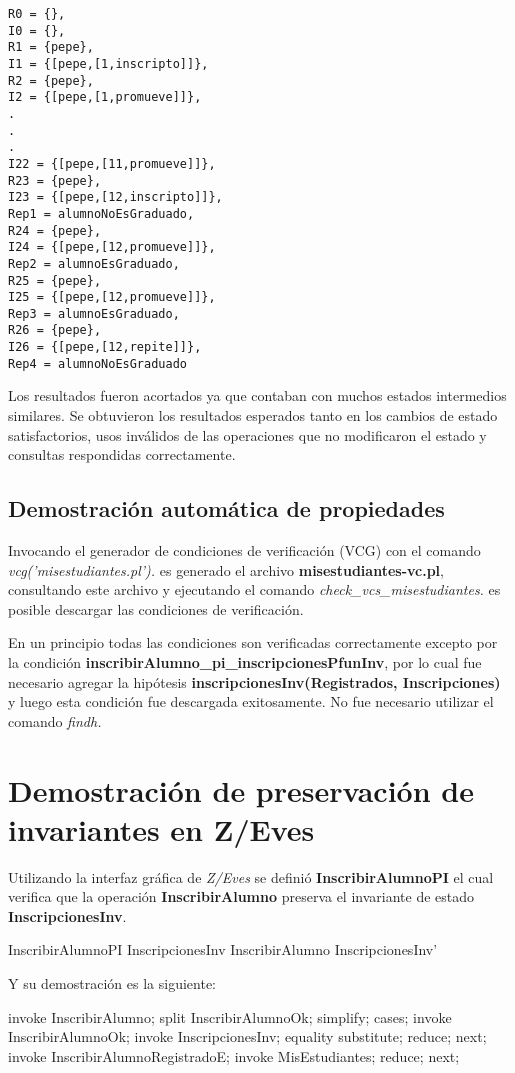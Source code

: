 \documentclass{article}
\begin{document}
\begin{verbatim}
R0 = {},  
I0 = {},  
R1 = {pepe},  
I1 = {[pepe,[1,inscripto]]},  
R2 = {pepe},  
I2 = {[pepe,[1,promueve]]},  
.
.
.
I22 = {[pepe,[11,promueve]]},  
R23 = {pepe},  
I23 = {[pepe,[12,inscripto]]},  
Rep1 = alumnoNoEsGraduado,  
R24 = {pepe},  
I24 = {[pepe,[12,promueve]]},  
Rep2 = alumnoEsGraduado,  
R25 = {pepe},  
I25 = {[pepe,[12,promueve]]},  
Rep3 = alumnoEsGraduado,  
R26 = {pepe},  
I26 = {[pepe,[12,repite]]},  
Rep4 = alumnoNoEsGraduado
\end{verbatim}

Los resultados fueron acortados ya que contaban con muchos estados intermedios similares. Se obtuvieron los resultados esperados tanto en los cambios de estado satisfactorios, usos inválidos de las operaciones que no modificaron el estado y consultas respondidas correctamente.

\subsection{Demostración automática de propiedades}
Invocando el generador de condiciones de verificación (VCG) con el comando \emph{vcg('misestudiantes.pl').} es generado el archivo \textbf{misestudiantes-vc.pl}, consultando este archivo y ejecutando el comando \emph{check\_vcs\_misestudiantes.} es posible descargar las condiciones de verificación.

En un principio todas las condiciones son verificadas correctamente excepto por la condición \textbf{inscribirAlumno\_pi\_inscripcionesPfunInv}, por lo cual fue necesario agregar la hipótesis \textbf{inscripcionesInv(Registrados, Inscripciones)} y luego esta condición fue descargada exitosamente. No fue necesario utilizar el comando \emph{findh.}

\section{Demostración de preservación de invariantes en Z/Eves}
Utilizando la interfaz gráfica de \emph{Z/Eves} se definió \textbf{InscribirAlumnoPI} el cual verifica que la operación \textbf{InscribirAlumno} preserva el invariante de estado \textbf{InscripcionesInv}.
\begin{theorem}{InscribirAlumnoPI}
  InscripcionesInv \land InscribirAlumno \implies InscripcionesInv'
\end{theorem}

Y su demostración es la siguiente:
\begin{zproof}[InscribirAlumnoPI]
  invoke InscribirAlumno;
  split InscribirAlumnoOk;
  simplify;
  cases;
  invoke InscribirAlumnoOk;
  invoke InscripcionesInv;
  equality substitute;
  reduce;
  next;
  invoke InscribirAlumnoRegistradoE;
  invoke \Xi MisEstudiantes;
  reduce;
  next;
\end{zproof}
\end{document}
